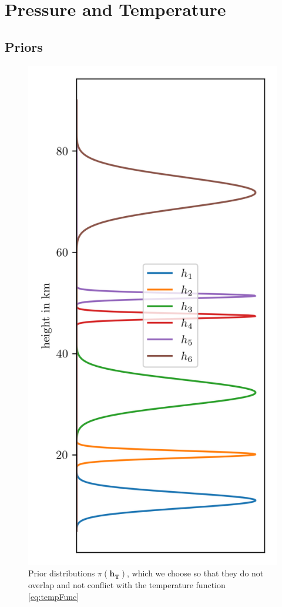 \section{Pressure and Temperature}

\subsection{Priors}
\begin{figure}[ht!]
	\centering
	\includegraphics{HeightPriors.png}
	\caption[Prior distributions $\pi(\bm{h_T})$.]{Prior distributions $\pi(\bm{h_T})$, which we choose so that they do not overlap and not conflict with the temperature function \ref{eq:tempFunc}}
	\label{fig:HeightPriors}
\end{figure} 


